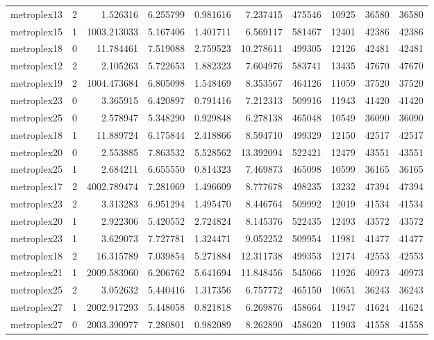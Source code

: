 \begin{longtable}{|l|r|r|r|r|r|r|r|r|r|}
metroplex13 & 2 & 1.526316 & 6.255799 & 0.981616 & 7.237415 & 475546 & 10925 & 36580 & 36580 \\
metroplex15 & 1 & 1003.213033 & 5.167406 & 1.401711 & 6.569117 & 581467 & 12401 & 42386 & 42386 \\
metroplex18 & 0 & 11.784461 & 7.519088 & 2.759523 & 10.278611 & 499305 & 12126 & 42481 & 42481 \\
metroplex12 & 2 & 2.105263 & 5.722653 & 1.882323 & 7.604976 & 583741 & 13435 & 47670 & 47670 \\
metroplex19 & 2 & 1004.473684 & 6.805098 & 1.548469 & 8.353567 & 464126 & 11059 & 37520 & 37520 \\
metroplex23 & 0 & 3.365915 & 6.420897 & 0.791416 & 7.212313 & 509916 & 11943 & 41420 & 41420 \\
metroplex25 & 0 & 2.578947 & 5.348290 & 0.929848 & 6.278138 & 465048 & 10549 & 36090 & 36090 \\
metroplex18 & 1 & 11.889724 & 6.175844 & 2.418866 & 8.594710 & 499329 & 12150 & 42517 & 42517 \\
metroplex20 & 0 & 2.553885 & 7.863532 & 5.528562 & 13.392094 & 522421 & 12479 & 43551 & 43551 \\
metroplex25 & 1 & 2.684211 & 6.655550 & 0.814323 & 7.469873 & 465098 & 10599 & 36165 & 36165 \\
metroplex17 & 2 & 4002.789474 & 7.281069 & 1.496609 & 8.777678 & 498235 & 13232 & 47394 & 47394 \\
metroplex23 & 2 & 3.313283 & 6.951294 & 1.495470 & 8.446764 & 509992 & 12019 & 41534 & 41534 \\
metroplex20 & 1 & 2.922306 & 5.420552 & 2.724824 & 8.145376 & 522435 & 12493 & 43572 & 43572 \\
metroplex23 & 1 & 3.629073 & 7.727781 & 1.324471 & 9.052252 & 509954 & 11981 & 41477 & 41477 \\
metroplex18 & 2 & 16.315789 & 7.039854 & 5.271884 & 12.311738 & 499353 & 12174 & 42553 & 42553 \\
metroplex21 & 1 & 2009.583960 & 6.206762 & 5.641694 & 11.848456 & 545066 & 11926 & 40973 & 40973 \\
metroplex25 & 2 & 3.052632 & 5.440416 & 1.317356 & 6.757772 & 465150 & 10651 & 36243 & 36243 \\
metroplex27 & 1 & 2002.917293 & 5.448058 & 0.821818 & 6.269876 & 458664 & 11947 & 41624 & 41624 \\
metroplex27 & 0 & 2003.390977 & 7.280801 & 0.982089 & 8.262890 & 458620 & 11903 & 41558 & 41558 \\

\end{longtable}
